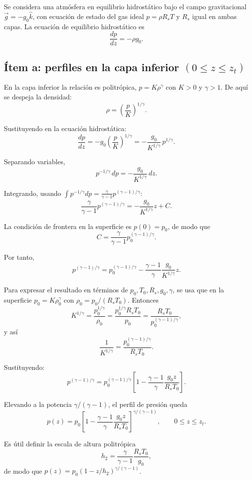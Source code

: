 \documentclass[12pt]{article}
\begin{document}
\begin{enumerate}
Se considera una atmósfera en equilibrio hidrostático bajo el campo gravitacional
$\vec{g}=-g_{0}\hat{k}$, con ecuación de estado del gas ideal $p=\rho R_{s}T$
y $R_{s}$ igual en ambas capas. La ecuación de equilibrio hidrostático es
$$\frac{dp}{dz}=-\rho g_{0}.$$

\subsection{Ítem a: perfiles en la capa inferior $(0\le z\le z_{t})$}

En la capa inferior la relación es politrópica, $p=K\rho^{\gamma}$ con $K>0$ y $\gamma>1$.
De aquí se despeja la densidad:
$$\rho=\left(\frac{p}{K}\right)^{1/\gamma}.$$

Sustituyendo en la ecuación hidrostática:
$$\frac{dp}{dz}=-g_{0}\left(\frac{p}{K}\right)^{1/\gamma}
=-\frac{g_{0}}{K^{1/\gamma}}\,p^{1/\gamma}.$$

Separando variables,
$$p^{-1/\gamma}\,dp=-\frac{g_{0}}{K^{1/\gamma}}\,dz.$$

Integrando, usando $\displaystyle \int p^{-1/\gamma}dp=\frac{\gamma}{\gamma-1}p^{(\gamma-1)/\gamma}$:
$$\frac{\gamma}{\gamma-1}p^{(\gamma-1)/\gamma}
=-\frac{g_{0}}{K^{1/\gamma}}z+C.$$

La condición de frontera en la superficie es $p(0)=p_{0}$, de modo que
$$C=\frac{\gamma}{\gamma-1}p_{0}^{(\gamma-1)/\gamma}.$$

Por tanto,
$$p^{(\gamma-1)/\gamma}
=p_{0}^{(\gamma-1)/\gamma}-\frac{\gamma-1}{\gamma}\frac{g_{0}}{K^{1/\gamma}}z.$$

Para expresar el resultado en términos de $p_{0},T_{0},R_{s},g_{0},\gamma$, se usa que en la superficie
$p_{0}=K\rho_{0}^{\gamma}$ con $\rho_{0}=p_{0}/(R_{s}T_{0})$. Entonces
$$K^{1/\gamma}=\frac{p_{0}^{1/\gamma}}{\rho_{0}}
=\frac{p_{0}^{1/\gamma}R_{s}T_{0}}{p_{0}}
=\frac{R_{s}T_{0}}{p_{0}^{(\gamma-1)/\gamma}},$$
y así
$$\frac{1}{K^{1/\gamma}}=\frac{p_{0}^{(\gamma-1)/\gamma}}{R_{s}T_{0}}.$$

Sustituyendo:
$$p^{(\gamma-1)/\gamma}
=p_{0}^{(\gamma-1)/\gamma}\left[1-\frac{\gamma-1}{\gamma}\frac{g_{0}z}{R_{s}T_{0}}\right].$$

Elevando a la potencia $\gamma/(\gamma-1)$, el perfil de presión queda
$$\boxed{\,p(z)=p_{0}\left[1-\frac{\gamma-1}{\gamma}\frac{g_{0}z}{R_{s}T_{0}}\right]^{\gamma/(\gamma-1)},\qquad 0\le z\le z_{t}.\,}$$

Es útil definir la escala de altura politrópica
$$h_{2}=\frac{\gamma}{\gamma-1}\frac{R_{s}T_{0}}{g_{0}},$$
de modo que $p(z)=p_{0}(1-z/h_{2})^{\gamma/(\gamma-1)}$.


\end{enumerate}
\end{document}
